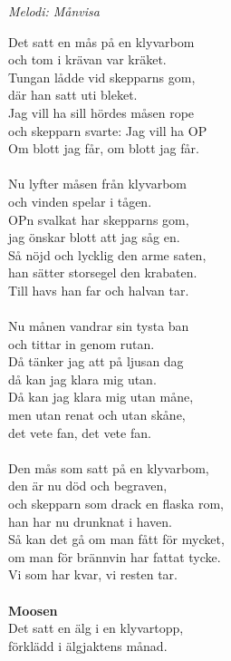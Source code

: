 {\footnotesize\textit{Melodi: Månvisa}}\par
\vspace{10pt}
Det satt en mås på en klyvarbom\\
och tom i krävan var kräket.\\
Tungan lådde vid skepparns gom,\\
där han satt uti bleket.\\
Jag vill ha sill hördes måsen rope\\
och skepparn svarte: Jag vill ha OP\\
Om blott jag får, om blott jag får.\\
\\
Nu lyfter måsen från klyvarbom\\
och vinden spelar i tågen.\\
OPn svalkat har skepparns gom,\\
jag önskar blott att jag såg en.\\
Så nöjd och lycklig den arme saten,\\
han sätter storsegel den krabaten.\\
Till havs han far och halvan tar.\\
\\
Nu månen vandrar sin tysta ban\\
och tittar in genom rutan.\\
Då tänker jag att på ljusan dag\\
då kan jag klara mig utan.\\
Då kan jag klara mig utan måne,\\ 
men utan renat och utan skåne,\\
det vete fan, det vete fan.\\
\\
Den mås som satt på en klyvarbom,\\
den är nu död och begraven,\\
och skepparn som drack en flaska rom,\\
han har nu drunknat i haven.\\
Så kan det gå om man fått för mycket,\\
om man för brännvin har fattat tycke.\\
Vi som har kvar, vi resten tar.\\
\\
\textbf{Moosen}\\
Det satt en älg i en klyvartopp,\\
förklädd i älgjaktens månad.\\
